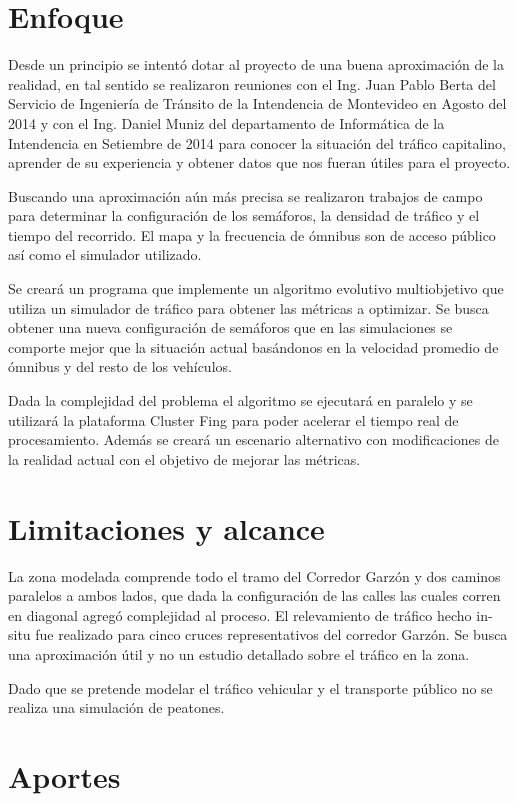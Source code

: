  
\section{Enfoque}

Desde un principio se intentó dotar al proyecto de una buena aproximación de la realidad, en tal sentido se realizaron reuniones con el Ing. Juan Pablo Berta del Servicio de Ingeniería de Tránsito de la Intendencia de Montevideo en Agosto del  2014 y con el Ing. Daniel Muniz del departamento de Informática de la Intendencia en Setiembre de 2014 para conocer la situación del tráfico capitalino, aprender de su experiencia y obtener datos que nos fueran útiles para el proyecto.


Buscando una aproximación aún más precisa se realizaron trabajos de campo para determinar la configuración de los semáforos, la densidad de tráfico y el tiempo del recorrido. El mapa y la frecuencia de ómnibus son de acceso público así como el simulador utilizado.

Se creará un programa que implemente un algoritmo evolutivo multiobjetivo que utiliza un simulador de tráfico para obtener las métricas a optimizar. Se busca obtener una nueva configuración de semáforos que en las simulaciones se comporte mejor que la situación actual basándonos en la velocidad promedio de ómnibus y del resto de los vehículos.

Dada la complejidad del problema el algoritmo se ejecutará en paralelo y se utilizará la plataforma Cluster Fing para poder acelerar el tiempo real de procesamiento. Además se creará un escenario alternativo con modificaciones de la realidad actual con el objetivo de mejorar las métricas.

\section{Limitaciones y alcance}

La zona modelada comprende todo el tramo del Corredor Garzón y dos caminos paralelos a ambos lados, que dada la configuración de las calles las cuales corren en diagonal agregó complejidad al proceso.
El relevamiento de tráfico hecho in-situ fue realizado para cinco cruces representativos del corredor Garzón. Se busca una aproximación útil y no un estudio detallado sobre el tráfico en la zona.

Dado que se pretende modelar el tráfico vehicular y el transporte público no se realiza una simulación de peatones.


\section{Aportes}

